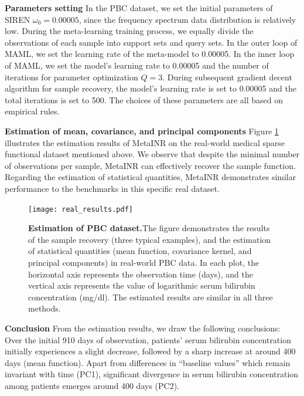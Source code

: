 \documentclass{article}
\begin{document}
\textbf{Parameters setting} 
In the PBC dataset, we set the initial parameters of SIREN $\omega_0=0.00005$, since the frequency spectrum data distribution is relatively low.
During the meta-learning training process, we equally divide the observations of each sample into support sets and query sets.
In the outer loop of MAML, we set the learning rate of the meta-model to 0.00005. 
In the inner loop of MAML, we set the model's learning rate to 0.00005 and the number of iterations for parameter optimization $Q=3$.
During subsequent gradient decent algorithm for sample recovery, the model's learning rate is set to 0.00005 and the total iterations is set to 500.
The choices of these parameters are all based on empirical rules.

\textbf{Estimation of mean, covariance, and principal components}
Figure \ref{Estimation for real-world data} illustrates the estimation results of MetaINR on the real-world medical sparse functional dataset mentioned above. 
We observe that despite the minimal number of observations per sample, 
MetaINR can effectively recover the sample function. 
Regarding the estimation of statistical quantities, 
MetaINR demonstrates similar performance to the benchmarks in this specific real dataset.
\begin{figure}[htb]
  \centering
  \texttt{[image: real\_results.pdf]}
  \caption{\textbf{Estimation of PBC dataset.}The figure demonstrates the results of the sample recovery (three typical examples), and the estimation of statistical quantities
  (mean function, covariance kernel, and principal components) in real-world PBC data. 
  In each plot, the horizontal axis represents the observation time (days), and the vertical axis represents the value of logarithmic serum bilirubin concentration (mg/dl). 
  The estimated results are similar in all three methods.
  }
  \label{Estimation for real-world data}
\end{figure}

\textbf{Conclusion}
From the estimation results, we draw the following conclusions: 
Over the initial 910 days of observation, patients' serum bilirubin concentration initially experiences a slight decrease, 
followed by a sharp increase at around 400 days (mean function). 
Apart from differences in ``baseline values'' which remain invariant with time (PC1), 
significant divergence in serum bilirubin concentration among patients emerges around 400 days (PC2).
\end{document}
